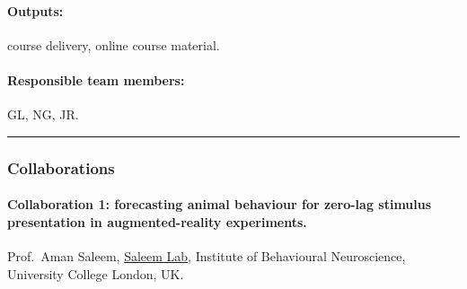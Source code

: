 \paragraph{Outputs:} course delivery, online course material.

\paragraph{Responsible team members:} GL, NG, JR.

\noindent\rule{\textwidth}{1pt}
\subsubsection*{Collaborations}

\paragraph{Collaboration 1: forecasting animal behaviour for zero-lag stimulus
presentation in augmented-reality experiments.} Prof.~Aman Saleem,
\href{https://www.saleemlab.com/}{Saleem Lab}, Institute of Behavioural
Neuroscience, University College London, UK.


